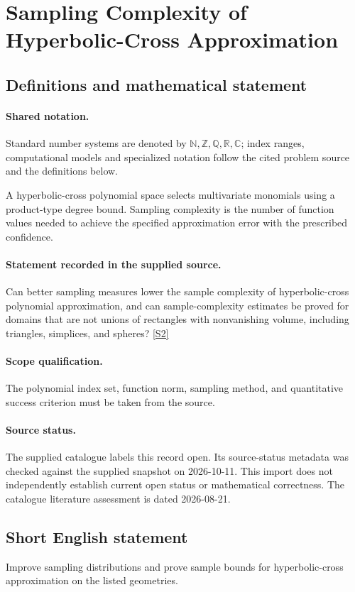 \documentclass[11pt]{article}
\newcommand{\sref}[2]{\hyperlink{source:#1:#2}{[S#2]}}
\begin{document}
\section{Sampling Complexity of Hyperbolic-Cross Approximation}\label{statement}

\subsection{Definitions and mathematical statement}

\paragraph{Shared notation.}Standard number systems are denoted by $\mathbb N,\mathbb Z,\mathbb Q,\mathbb R,\mathbb C$; index ranges, computational models and specialized notation follow the cited problem source and the definitions below.


A hyperbolic-cross polynomial space selects multivariate monomials using a product-type degree bound. Sampling complexity is the number of function values needed to achieve the specified approximation error with the prescribed confidence.
\paragraph{Statement recorded in the supplied source.}
Can better sampling measures lower the sample complexity of hyperbolic-cross polynomial approximation, and can sample-complexity estimates be proved for domains that are not unions of rectangles with nonvanishing volume, including triangles, simplices, and spheres? \sref{statement}{2}
\paragraph{Scope qualification.}
The polynomial index set, function norm, sampling method, and quantitative success criterion must be taken from the source.
\paragraph{Source status.}
The supplied catalogue labels this record open. Its source-status metadata was checked against the supplied snapshot on 2026-10-11. This import does not independently establish current open status or mathematical correctness. The catalogue literature assessment is dated 2026-08-21.
\subsection{Short English statement}
Improve sampling distributions and prove sample bounds for hyperbolic-cross approximation on the listed geometries.
\end{document}
